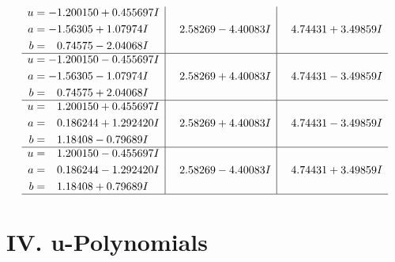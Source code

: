 \documentclass[1p]{elsarticle_modified}
\theoremstyle{definition}
\begin{document}
$$\begin{array}{c|c|c}
\begin{aligned}
u &= -1.200150 + 0.455697 I \\
a &= -1.56305 + 1.07974 I \\
b &= \phantom{-}0.74575 - 2.04068 I\end{aligned}
 & \phantom{-}2.58269 - 4.40083 I & \phantom{-}4.74431 + 3.49859 I \\ \hline\begin{aligned}
u &= -1.200150 - 0.455697 I \\
a &= -1.56305 - 1.07974 I \\
b &= \phantom{-}0.74575 + 2.04068 I\end{aligned}
 & \phantom{-}2.58269 + 4.40083 I & \phantom{-}4.74431 - 3.49859 I \\ \hline\begin{aligned}
u &= \phantom{-}1.200150 + 0.455697 I \\
a &= \phantom{-}0.186244 + 1.292420 I \\
b &= \phantom{-}1.18408 - 0.79689 I\end{aligned}
 & \phantom{-}2.58269 + 4.40083 I & \phantom{-}4.74431 - 3.49859 I \\ \hline\begin{aligned}
u &= \phantom{-}1.200150 - 0.455697 I \\
a &= \phantom{-}0.186244 - 1.292420 I \\
b &= \phantom{-}1.18408 + 0.79689 I\end{aligned}
 & \phantom{-}2.58269 - 4.40083 I & \phantom{-}4.74431 + 3.49859 I\\
 \hline 
 \end{array}$$\newpage
\newpage\renewcommand{\arraystretch}{1}
\centering \section*{ IV. u-Polynomials}
\end{document}
